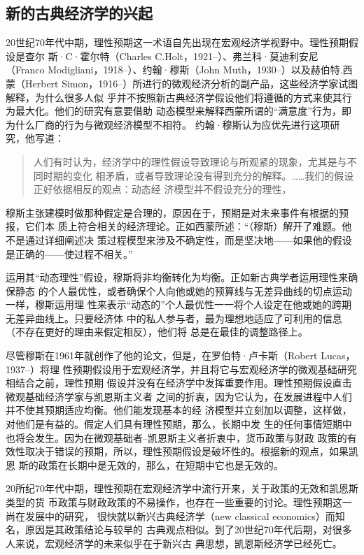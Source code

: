 \subsection{新的古典经济学的兴起}

20世纪70年代中期，理性预期这一术语自先出现在宏观经济学视野中。理性预期假设是查尔
斯·C·霍尔特（Charles C.Holt，1921--）、弗兰科·莫迪利安尼 （Franco
Modigliani，1918--）、约翰·穆斯（John Muth，1930--）以及赫伯特.西蒙（Herbert
Simon，1916--）所进行的微观经济分析的副产品，这些经济学家试图解释，为什么很多人似
乎并不按照新古典经济学假设他们将遵循的方式来使其行为最大化。他们的研究有意要借助
动态模型来解释西蒙所谓的“满意度”行为，即为什么厂商的行为与微观经济模型不相符。
约翰·穆斯认为应优先进行这项研究，他写道：

\begin{quotation}
  人们有时认为，经济学中的理性假设导致理论与所观紧的现象，尤其是与不同时期的变化
  相矛盾，或者导致理论没有得到充分的解释。……我们的假设正好依据相反的观点：动态经
  济模型并不假设充分的理性，
\end{quotation}

穆斯主张建模时做那种假定是合理的，原因在于，预期是对未来事件有根据的预报，它们本
质上符合相关的经济理论。正如西蒙所述：“（穆斯）解开了难题。他不是通过详细阐述决
策过程模型来涉及不确定性，而是坚决地——如果他的假设是正确的——使过程不相关。”

运用其“动态理性”假设，穆斯将非均衡转化为均衡。正如新古典学者运用理性来确保静态
的个人最优性，或者确保个人向他或她的预算线与无差异曲线的切点运动一样，穆斯运用理
性来表示“动态的”个人最优性一一将个人设定在他或她的跨期无差异曲线上。只要经济体
中的私人参与者，最为理想地适应了可利用的信息（不存在更好的理由来假定相反），他们将
总是在最佳的调整路径上。

尽管穆斯在1961年就创作了他的论文，但是，在罗伯特·卢卡斯（Robert Lucas，1937--）将理
性预期假设用于宏观经济学，并且将它与宏观经济学的微观基础研究相结合之前，理性预期
假设并没有在经济学中发挥重要作用。理性预期假设直击微观基础经济学家与凯恩斯主义者
之间的折衷，因为它认为，在发展进程中人们并不使其预期适应均衡。他们能发现基本的经
济模型并立刻加以调整，这样做，对他们是有益的。假定人们具有理性预期，那么，长期中发
生的任何事情短期中也将会发生。因为在微观基础者--凯恩斯主义者折衷中，货币政策与财政
政策的有效性取决于错误的预期，所以，理性预期假设是破坏性的。根据新的观点，如果凯恩
斯的政策在长期中是无效的，那么，在短期中它也是无效的。

20所纪70年代中期，理性预期在宏观经济学中流行开来，关于政策的无效和凯恩斯类型的货
币政策与财政政策的不易操作，也存在一些重要的讨论。理性预期这一尚在发展中的研究，
很快就以新兴古典经济学（new classical economics）而知名，原因是其政策结论与较早的
古典观点相似。到了20世纪70年代后期，对很多人来说，宏观经济学的未来似乎在于新兴古
典思想，凯恩斯经济学已经死亡。

